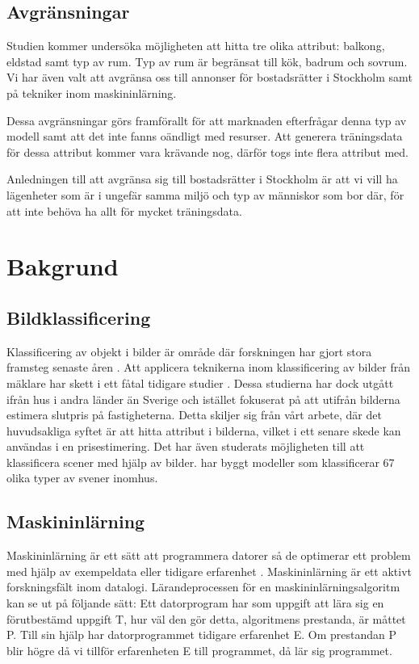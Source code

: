 \documentclass[]{kththesis}
\begin{document}
\section{Avgränsningar}
Studien kommer undersöka möjligheten att hitta tre olika attribut: balkong, eldstad samt typ av rum. Typ av rum är begränsat till kök, badrum och sovrum. Vi har även valt att avgränsa oss till annonser för bostadsrätter i Stockholm samt på tekniker inom maskininlärning. 

Dessa avgränsningar görs framförallt för att marknaden efterfrågar denna typ av modell samt att det inte fanns oändligt med resurser. Att generera träningsdata för dessa attribut kommer vara krävande nog, därför togs inte flera attribut med.

Anledningen till att avgränsa sig till bostadsrätter i Stockholm är att vi vill ha lägenheter som är i ungefär samma miljö och typ av människor som bor där, för att inte behöva ha allt för mycket träningsdata. 



\chapter{Bakgrund}

\section{Bildklassificering}
Klassificering av objekt i bilder är område där forskningen har gjort stora framsteg senaste åren \parencite{Goodfellow-et-al-2016}. Att applicera teknikerna inom klassificering av bilder från mäklare har skett i ett fåtal tidigare studier \parencite{cao2019classification} \parencite{poursaeed2018vision}. Dessa studierna har dock utgått ifrån hus i andra länder än Sverige och istället fokuserat på att utifrån bilderna estimera slutpris på fastigheterna. Detta skiljer sig från vårt arbete, där det huvudsakliga syftet är att hitta attribut i bilderna, vilket i ett senare skede kan användas i en prisestimering. Det har även studerats möjligheten till att klassificera scener med hjälp av bilder. \cite{zhou2014learning} har byggt modeller som klassificerar 67 olika typer av svener inomhus. 

\section{Maskininlärning}
Maskininlärning är ett sätt att programmera datorer så de optimerar ett problem med hjälp av exempeldata eller tidigare erfarenhet \parencite{alpaydin2009introduction}. Maskininlärning är ett aktivt forskningsfält inom datalogi. Lärandeprocessen för en maskininlärningsalgoritm kan se ut på följande sätt: Ett datorprogram har som uppgift att lära sig en förutbestämd uppgift T, hur väl den gör detta, algoritmens prestanda, är måttet P. Till sin hjälp har datorprogrammet tidigare erfarenhet E. Om prestandan P blir högre då vi tillför erfarenheten E till programmet, då lär sig programmet.
\end{document}
